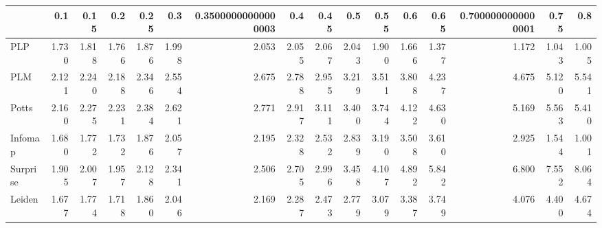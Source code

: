 \begin{tabular}{lrrrrrrrrrrrrrrr}
\toprule
{} &   0.1 &  0.15 &   0.2 &  0.25 &   0.3 & 0.35000000000000003 &   0.4 &  0.45 &   0.5 &  0.55 &   0.6 &  0.65 & 0.7000000000000001 &  0.75 &   0.8 \\
\midrule
PLP      & 1.730 & 1.818 & 1.766 & 1.876 & 1.998 &               2.053 & 2.055 & 2.067 & 2.043 & 1.900 & 1.666 & 1.377 &              1.172 & 1.043 & 1.005 \\
PLM      & 2.121 & 2.240 & 2.188 & 2.346 & 2.554 &               2.675 & 2.788 & 2.955 & 3.219 & 3.511 & 3.808 & 4.237 &              4.675 & 5.120 & 5.541 \\
Potts    & 2.160 & 2.275 & 2.231 & 2.384 & 2.621 &               2.771 & 2.917 & 3.111 & 3.400 & 3.744 & 4.122 & 4.630 &              5.169 & 5.563 & 5.410 \\
Infomap  & 1.680 & 1.772 & 1.732 & 1.876 & 2.057 &               2.195 & 2.328 & 2.532 & 2.839 & 3.190 & 3.508 & 3.610 &              2.925 & 1.544 & 1.001 \\
Surprise & 1.905 & 2.007 & 1.957 & 2.128 & 2.341 &               2.506 & 2.705 & 2.996 & 3.458 & 4.107 & 4.892 & 5.842 &              6.800 & 7.552 & 8.064 \\
Leiden   & 1.677 & 1.774 & 1.718 & 1.860 & 2.046 &               2.169 & 2.287 & 2.473 & 2.779 & 3.079 & 3.387 & 3.749 &              4.076 & 4.400 & 4.674 \\
\bottomrule
\end{tabular}

